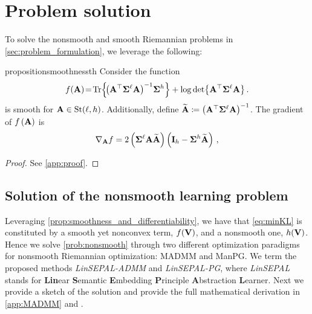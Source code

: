 \section{Problem solution}\label{sec:problem_solution}
To solve the nonsmooth and smooth Riemannian problems in \cref{sec:problem_formulation}, we leverage the following:

\begin{restatable}{proposition}{smoothnessth}\label{prop:smoothness_and_differentiability}
    Consider the function
    \begin{equation}\label{eq:general_objective}
        f(\A)\!=\!\Tr{\!\left(\A^\top \covlow \A \right)^{-1} \! \covhigh} + \log\det{\A^\top \covlow \A }\,.
    \end{equation}
     is smooth for $\mathbf{A} \in \mathrm{St}({\ell},{h})$.
    Additionally, define $\widetilde{\mathbf{A}}\coloneqq\left(\mathbf{A}^\top \boldsymbol{\Sigma}^{\ell} \mathbf{A}\right)^{-1}$.
    The gradient of $f\left(\mathbf{A}\right)$ is
    \begin{equation}\label{eq:gradA}
        \nabla_{\mathbf{A}} f = 2\left(\boldsymbol{\Sigma}^{\ell}\mathbf{A}\widetilde{\mathbf{A}}\right)\left(\mathbf{I}_h - \boldsymbol{\Sigma}^{h}\widetilde{\mathbf{A}}\right)\,,
    \end{equation}
\end{restatable}
\begin{proof}
See \cref{app:proof}.
\end{proof}

\subsection{Solution of the nonsmooth learning problem}\label{subsec:sol_nonsmoot}
Leveraging \cref{prop:smoothness_and_differentiability}, we have that \cref{eq:minKL} is constituted by a smooth yet nonconvex term, $f(\mathbf{V})$, and a nonsmooth one, $h(\mathbf{V})$. Hence we solve \cref{prob:nonsmooth} through two different optimization paradigms for nonsmooth Riemannian optimization: MADMM and ManPG.
We term the proposed methods \emph{LinSEPAL-ADMM} and \emph{LinSEPAL-PG}, where \textit{LinSEPAL} stands for \textbf{Lin}ear \textbf{S}emantic \textbf{E}mbedding \textbf{P}rinciple \textbf{A}bstraction \textbf{L}earner.
Next we provide a sketch of the solution and provide the full mathematical derivation in \cref{app:MADMM} and .

